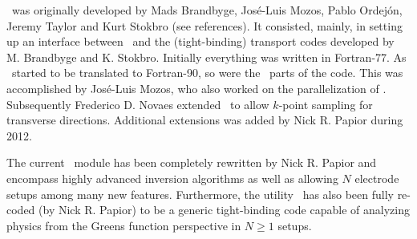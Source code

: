 \tsiesta\ was originally developed by Mads Brandbyge,
Jos\'e-Luis Mozos, Pablo Ordej\'on, Jeremy Taylor and Kurt Stokbro
(see references). It consisted, mainly, in setting up an interface
between \siesta\ and the (tight-binding) transport codes developed
by M. Brandbyge and K. Stokbro. Initially everything was written in
Fortran-77. As \siesta\ started to be translated to Fortran-90, so
were the \tsiesta\ parts of the code. This was accomplished by
Jos\'e-Luis Mozos, who also worked on the parallelization of
\tsiesta. 
%
Subsequently Frederico D. Novaes extended \tsiesta\ to allow $k$-point
sampling for transverse directions. Additional extensions was
added by Nick R. Papior during 2012.

The current \tsiesta\ module has been completely rewritten by Nick
R. Papior and encompass highly advanced inversion algorithms as well
as allowing $N$ electrode setups among many new features. Furthermore,
the utility \tbtrans\ has also been fully re-coded (by Nick R. Papior)
to be a generic tight-binding code capable of analyzing physics from
the Greens function perspective in $N\ge1$ setups.


